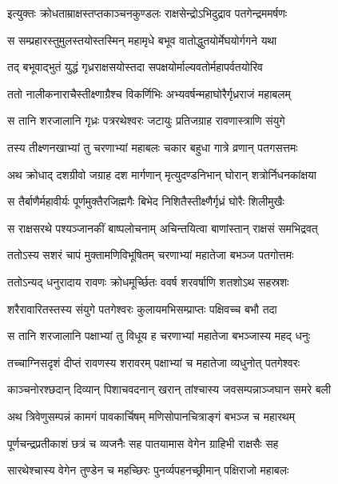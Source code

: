 
\twolineshloka
{इत्युक्तः क्रोधताम्राक्षस्तप्तकाञ्चनकुण्डलः}
{राक्षसेन्द्रोऽभिदुद्राव पतगेन्द्रममर्षणः} %

\twolineshloka
{स सम्प्रहारस्तुमुलस्तयोस्तस्मिन् महामृधे}
{बभूव वातोद्धुतयोर्मेघयोर्गगने यथा} %

\twolineshloka
{तद् बभूवाद्भुतं युद्धं गृध्रराक्षसयोस्तदा}
{सपक्षयोर्माल्यवतोर्महापर्वतयोरिव} %

\twolineshloka
{ततो नालीकनाराचैस्तीक्ष्णाग्रैश्च विकर्णिभिः}
{अभ्यवर्षन्महाघोरैर्गृध्रराजं महाबलम्} %

\twolineshloka
{स तानि शरजालानि गृध्रः पत्ररथेश्वरः}
{जटायुः प्रतिजग्राह रावणास्त्राणि संयुगे} %

\twolineshloka
{तस्य तीक्ष्णनखाभ्यां तु चरणाभ्यां महाबलः}
{चकार बहुधा गात्रे व्रणान् पतगसत्तमः} %

\twolineshloka
{अथ क्रोधाद् दशग्रीवो जग्राह दश मार्गणान्}
{मृत्युदण्डनिभान् घोरान् शत्रोर्निधनकांक्षया} %

\twolineshloka
{स तैर्बाणैर्महावीर्यः पूर्णमुक्तैरजिह्मगैः}
{बिभेद निशितैस्तीक्ष्णैर्गृध्रं घोरैः शिलीमुखैः} %

\twolineshloka
{स राक्षसरथे पश्यञ्जानकीं बाष्पलोचनाम्}
{अचिन्तयित्वा बाणांस्तान् राक्षसं समभिद्रवत्} %

\twolineshloka
{ततोऽस्य सशरं चापं मुक्तामणिविभूषितम्}
{चरणाभ्यां महातेजा बभञ्ज पतगोत्तमः} %

\twolineshloka
{ततोऽन्यद् धनुरादाय रावणः क्रोधमूर्च्छितः}
{ववर्ष शरवर्षाणि शतशोऽथ सहस्रशः} %

\twolineshloka
{शरैरावारितस्तस्य संयुगे पतगेश्वरः}
{कुलायमभिसम्प्राप्तः पक्षिवच्च बभौ तदा} %

\twolineshloka
{स तानि शरजालानि पक्षाभ्यां तु विधूय ह}
{चरणाभ्यां महातेजा बभञ्जास्य महद् धनुः} %

\twolineshloka
{तच्चाग्निसदृशं दीप्तं रावणस्य शरावरम्}
{पक्षाभ्यां च महातेजा व्यधुनोत् पतगेश्वरः} %

\twolineshloka
{काञ्चनोरश्छदान् दिव्यान् पिशाचवदनान् खरान्}
{तांश्चास्य जवसम्पन्नाञ्जघान समरे बली} %

\twolineshloka
{अथ त्रिवेणुसम्पन्नं कामगं पावकार्चिषम्}
{मणिसोपानचित्राङ्गं बभञ्ज च महारथम्} %

\twolineshloka
{पूर्णचन्द्रप्रतीकाशं छत्रं च व्यजनैः सह}
{पातयामास वेगेन ग्राहिभी राक्षसैः सह} %

\twolineshloka
{सारथेश्चास्य वेगेन तुण्डेन च महच्छिरः}
{पुनर्व्यपहनच्छ्रीमान् पक्षिराजो महाबलः} %

